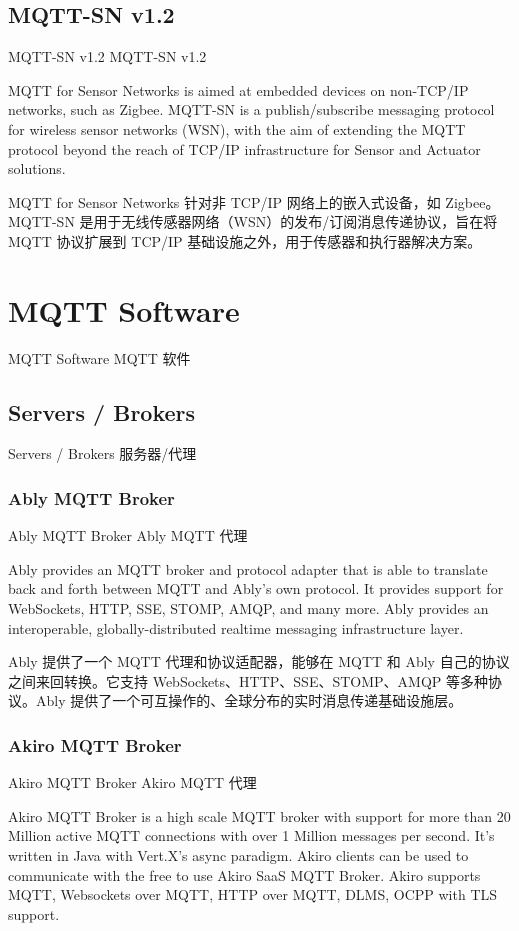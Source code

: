 \documentclass{ctexbook}
\begin{document}
\subsection{MQTT-SN v1.2}
MQTT-SN v1.2 MQTT-SN v1.2

MQTT for Sensor Networks is aimed at embedded devices on non-TCP/IP networks, such as Zigbee. MQTT-SN is a publish/subscribe messaging protocol for wireless sensor networks (WSN), with the aim of extending the MQTT protocol beyond the reach of TCP/IP infrastructure for Sensor and Actuator solutions. 

MQTT for Sensor Networks 针对非 TCP/IP 网络上的嵌入式设备，如 Zigbee。MQTT-SN 是用于无线传感器网络（WSN）的发布/订阅消息传递协议，旨在将 MQTT 协议扩展到 TCP/IP 基础设施之外，用于传感器和执行器解决方案。

\section{MQTT Software}
MQTT Software MQTT 软件

\subsection{Servers / Brokers}
Servers / Brokers 服务器/代理

\subsubsection{Ably MQTT Broker}
Ably MQTT Broker Ably MQTT 代理

Ably provides an MQTT broker and protocol adapter that is able to translate back and forth between MQTT and Ably's own protocol. It provides support for WebSockets, HTTP, SSE, STOMP, AMQP, and many more. Ably provides an interoperable, globally-distributed realtime messaging infrastructure layer.

Ably 提供了一个 MQTT 代理和协议适配器，能够在 MQTT 和 Ably 自己的协议之间来回转换。它支持 WebSockets、HTTP、SSE、STOMP、AMQP 等多种协议。Ably 提供了一个可互操作的、全球分布的实时消息传递基础设施层。

\subsubsection{Akiro MQTT Broker}
Akiro MQTT Broker Akiro MQTT 代理

Akiro MQTT Broker is a high scale MQTT broker with support for more than 20 Million active MQTT connections with over 1 Million messages per second. It's written in Java with Vert.X's async paradigm. Akiro clients can be used to communicate with the free to use Akiro SaaS MQTT Broker. Akiro supports MQTT, Websockets over MQTT, HTTP over MQTT, DLMS, OCPP with TLS support.
\end{document}
